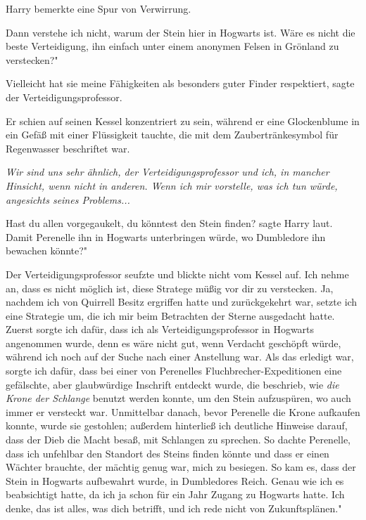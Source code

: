 Harry bemerkte eine Spur von Verwirrung.

\glqq Dann verstehe ich nicht, warum der Stein hier in Hogwarts ist. Wäre es
nicht die beste Verteidigung, ihn einfach unter einem anonymen Felsen in
Grönland zu verstecken?"

\glqq Vielleicht hat sie meine Fähigkeiten als besonders guter Finder
respektiert\grqq{}, sagte der Verteidigungsprofessor.

Er schien auf seinen Kessel konzentriert zu sein, während er eine Glockenblume
in ein Gefäß mit einer Flüssigkeit tauchte, die mit dem Zaubertränkesymbol für
Regenwasser beschriftet war.

\emph{Wir sind uns sehr ähnlich, der Verteidigungsprofessor und ich, in mancher Hinsicht, wenn nicht in anderen. Wenn ich mir vorstelle, was ich tun würde, angesichts seines Problems...}

\glqq Hast du allen vorgegaukelt, du könntest den Stein finden?\grqq{} sagte
Harry laut. \glqq Damit Perenelle ihn in Hogwarts unterbringen würde, wo
Dumbledore ihn bewachen könnte?"

Der Verteidigungsprofessor seufzte und blickte nicht vom Kessel auf. \glqq Ich
nehme an, dass es nicht möglich ist, diese Stratege müßig vor dir zu verstecken.
Ja, nachdem ich von Quirrell Besitz ergriffen hatte und zurückgekehrt war,
setzte ich eine Strategie um, die ich mir beim Betrachten der Sterne ausgedacht
hatte. Zuerst sorgte ich dafür, dass ich als Verteidigungsprofessor in Hogwarts
angenommen wurde, denn es wäre nicht gut, wenn Verdacht geschöpft würde, während
ich noch auf der Suche nach einer Anstellung war. Als das erledigt war, sorgte
ich dafür, dass bei einer von Perenelles Fluchbrecher-Expeditionen eine
gefälschte, aber glaubwürdige Inschrift entdeckt wurde, die beschrieb, wie
\emph{die Krone der Schlange} benutzt werden konnte, um den Stein aufzuspüren,
wo auch immer er versteckt war. Unmittelbar danach, bevor Perenelle die Krone
aufkaufen konnte, wurde sie gestohlen; außerdem hinterließ ich deutliche
Hinweise darauf, dass der Dieb die Macht besaß, mit Schlangen zu sprechen. So
dachte Perenelle, dass ich unfehlbar den Standort des Steins finden könnte und
dass er einen Wächter brauchte, der mächtig genug war, mich zu besiegen. So kam
es, dass der Stein in Hogwarts aufbewahrt wurde, in Dumbledores Reich. Genau wie
ich es beabsichtigt hatte, da ich ja schon für ein Jahr Zugang zu Hogwarts
hatte. Ich denke, das ist alles, was dich betrifft, und ich rede nicht von
Zukunftsplänen."

